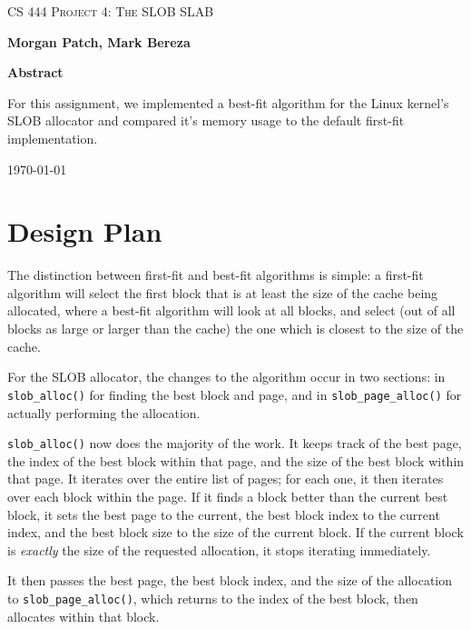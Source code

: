 \documentclass[letterpaper,10pt,titlepage,draftclsnofoot,onecolumn]{article}
\def\name{Morgan Patch, Mark Bereza}
\def\subj{CS 444 Project 4: The SLOB SLAB}
\begin{document}
\begin{titlepage}
	\centering
	{\scshape\huge \subj \par}
	\vspace{1.5cm}
	{\LARGE\bfseries \name\par}

	\vfill
	
	{\large\bfseries Abstract\par}
	\vspace{0.5cm}
	
	For this assignment, we implemented a best-fit algorithm for the Linux kernel's SLOB allocator and compared it's memory usage to the default first-fit implementation.
	
	\vfill

	{\large \today\par}
\end{titlepage}

\tableofcontents
\newpage

\section{Design Plan}

The distinction between first-fit and best-fit algorithms is simple: a first-fit algorithm will
select the first block that is at least the size of the cache being allocated, where a best-fit
algorithm will look at all blocks, and select (out of all blocks as large or larger than the cache)
the one which is closest to the size of the cache.

For the SLOB allocator, the changes to the algorithm occur in two sections: in \verb+slob_alloc()+
for finding the best block and page, and in \verb+slob_page_alloc()+ for actually performing the
allocation.

\verb+slob_alloc()+ now does the majority of the work. It keeps track of the best page, the index
of the best block within that page, and the size of the best block within that page. It iterates
over the entire list of pages; for each one, it then iterates over each block within the page. If
it finds a block better than the current best block, it sets the best page to the current, the best
block index to the current index, and the best block size to the size of the current block. If the
current block is \textit{exactly} the size of the requested allocation, it stops iterating
immediately.

It then passes the best page, the best block index, and the size of the allocation to
\verb+slob_page_alloc()+, which returns to the index of the best block, then allocates within that
block.
\end{document}
